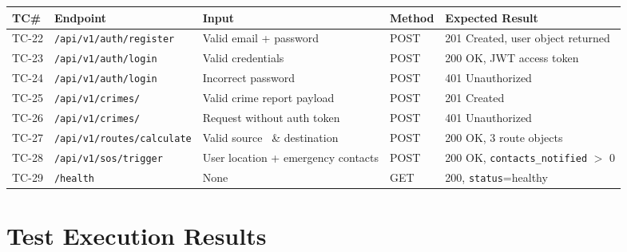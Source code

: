 \documentclass[12pt,a4paper]{report}
\begin{document}
\small
\begin{longtable}{@{}p{0.8cm}p{4cm}p{4cm}p{1.8cm}p{3.5cm}@{}}
\toprule
\textbf{TC\#} & \textbf{Endpoint} & \textbf{Input} & \textbf{Method} & \textbf{Expected Result} \\
\midrule
\endhead
TC-22 & \texttt{/api/v1/auth/register} & Valid email + password & POST & 201 Created, user object returned \\
\addlinespace
TC-23 & \texttt{/api/v1/auth/login} & Valid credentials & POST & 200 OK, JWT access token \\
\addlinespace
TC-24 & \texttt{/api/v1/auth/login} & Incorrect password & POST & 401 Unauthorized \\
\addlinespace
TC-25 & \texttt{/api/v1/crimes/} & Valid crime report payload & POST & 201 Created \\
\addlinespace
TC-26 & \texttt{/api/v1/crimes/} & Request without auth token & POST & 401 Unauthorized \\
\addlinespace
TC-27 & \texttt{/api/v1/routes/calculate} & Valid source \ \& destination & POST & 200 OK, 3 route objects \\
\addlinespace
TC-28 & \texttt{/api/v1/sos/trigger} & User location + emergency contacts & POST & 200 OK, \texttt{contacts\_notified} $>$ 0 \\
\addlinespace
TC-29 & \texttt{/health} & None & GET & 200, \texttt{status}=healthy \\
\bottomrule
\end{longtable}
\normalsize

\section{Test Execution Results}
\end{document}
